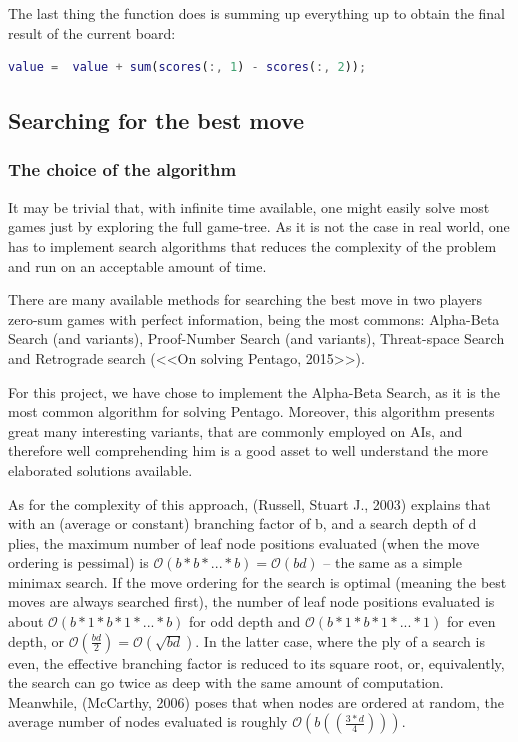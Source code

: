 The last thing the function does is summing up everything up to obtain the final
result of the current board:

\vspace{10pt}

\begin{lstlisting}[language=Matlab]
value =  value + sum(scores(:, 1) - scores(:, 2));
\end{lstlisting}

\subsection{Searching for the best move}

\subsubsection{The choice of the algorithm}


It may be trivial that, with infinite time available, one might easily solve
most games just by exploring the full game-tree. As it is not the case in real
world, one has to implement search algorithms that reduces the complexity of
the problem and run on an acceptable amount of time.

\vspace{10pt}

There are many available methods for searching the best move in two players
zero-sum games with perfect information, being the most commons: Alpha-Beta
Search (and variants), Proof-Number Search (and variants), Threat-space Search
and Retrograde search (<<On solving Pentago, 2015>>).

\vspace{10pt}

For this project, we have chose to implement the Alpha-Beta Search, as it is
the most common algorithm for solving Pentago. Moreover, this algorithm
presents great many interesting variants, that are commonly employed on AIs,
and therefore well comprehending him is a good asset to well understand the
more elaborated solutions available.

\vspace{10pt}

As for the complexity of this approach, (Russell, Stuart J., 2003) explains
that with an (average or constant) branching factor of b, and a search depth of
d plies, the maximum number of leaf node positions evaluated (when the move
ordering is pessimal) is \( \mathcal{O}( b*b*...*b ) = \mathcal{O}( bd ) \) –
the same as a simple minimax search. If the move ordering for the search is
optimal (meaning the best moves are always searched first), the number of leaf
node positions evaluated is about \(\mathcal{O}(b*1*b*1*...*b)\) for odd depth
and \(\mathcal{O}( b*1*b*1*...*1 ) \) for even depth, or \(\mathcal{O}(
\frac{bd}{2} ) = \mathcal{O}( \sqrt { bd }  ) \). In the latter case, where the
ply of a search is even, the effective branching factor is reduced to its
square root, or, equivalently, the search can go twice as deep with the same
amount of computation. Meanwhile, (McCarthy, 2006) poses that when nodes are
ordered at random, the average number of nodes evaluated is roughly \(\mathcal{O}(
b(\left( \frac{3*d}{4} \right)) )\).

